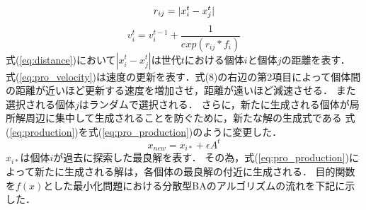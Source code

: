 \documentclass{jarticle}
\begin{document}
\begin{equation}
\label{eq:distance}
r_{ij}=|x_i^t-x_j^t| \\
\end{equation}
\begin{equation}
\label{eq:pro_velocity}
v_i^t=v_i^{t-1}+\frac{1}{exp(r_{ij}*f_i)}
\end{equation}
式(\ref{eq:distance})において$|x_i^t - x_j^t|$は世代$t$における個体$i$と個体$j$の距離を表す．
式(\ref{eq:pro_velocity})は速度の更新を表す．式(8)の右辺の第2項目によって個体間の距離が近いほど更新する速度を増加させ，距離が遠いほど減速させる．
また選択される個体$j$はランダムで選択される．
さらに，新たに生成される個体が局所解周辺に集中して生成されることを防ぐために，新たな解の生成式である
式(\ref{eq:production})を式(\ref{eq:pro_production})のように変更した．
\begin{equation}
  \label{eq:pro_production}
    x_{new}=x_{i*}+\epsilon A^t  
\end{equation}
$x_{i*}$は個体$i$が過去に探索した最良解を表す．
その為，式(\ref{eq:pro_production})によって新たに生成される解は，各個体の最良解の付近に生成される．
目的関数を${f(x)}$とした最小化問題における分散型BAのアルゴリズムの流れを下記に示した．\\
\end{document}
